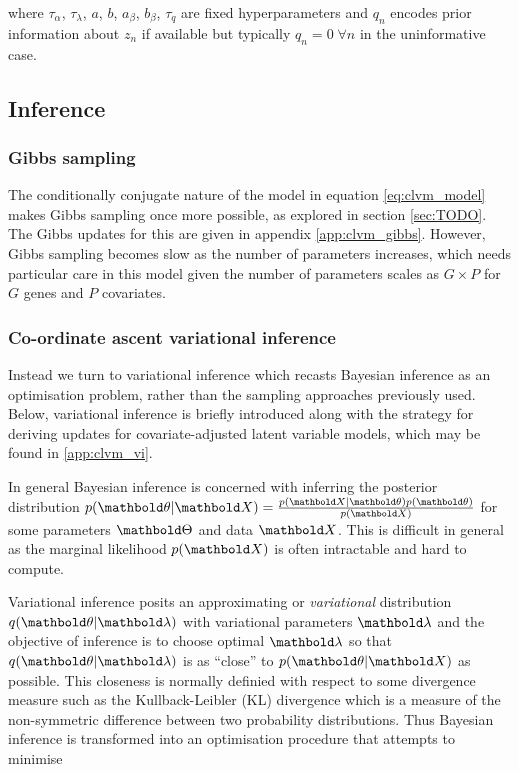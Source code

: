 where $\tau_\alpha$, $\tau_\lambda$, $a$, $b$, $a_\beta$, $b_\beta$, $\tau_q$ are fixed hyperparameters and $q_n$ encodes prior information about $z_n$ if available but typically $q_n = 0 \; \forall n$ in the uninformative case.



\subsection{Inference}

\subsubsection{Gibbs sampling}

The conditionally conjugate nature of the model in equation \ref{eq:clvm_model} makes Gibbs sampling once more possible, as explored in section \ref{sec:TODO}. The Gibbs updates for this are given in appendix \ref{app:clvm_gibbs}. However, Gibbs sampling becomes slow as the number of parameters increases, which needs particular care in this model given the number of parameters scales as $G \times P$ for $G$ genes and $P$ covariates.

\subsubsection{Co-ordinate ascent variational inference}

Instead we turn to variational inference which recasts Bayesian inference as an optimisation problem, rather than the sampling approaches previously used. Below, variational inference is briefly introduced along with the strategy for deriving updates for covariate-adjusted latent variable models, which may be found in \ref{app:clvm_vi}.

In general Bayesian inference is concerned with inferring the posterior distribution $p(\mbtheta | \mbX) = \frac{p(\mbX | \mbtheta) p(\mbtheta)}{p(\mbX)}$ for some parameters $\mbTheta$ and data $\mbX$. This is difficult in general as the marginal likelihood $p(\mbX)$ is often intractable and hard to compute.

Variational inference posits an approximating or \emph{variational} distribution $q(\mbtheta | \mblambda)$ with variational parameters $\mblambda$ and the objective of inference is to choose optimal $\mblambda$ so that $q(\mbtheta | \mblambda)$ is as ``close'' to $p(\mbtheta | \mbX)$ as possible. This closeness is normally definied with respect to some divergence measure such as the Kullback-Leibler (KL) divergence which is a measure of the non-symmetric difference between two probability distributions. Thus Bayesian inference is transformed into an optimisation procedure that attempts to minimise


